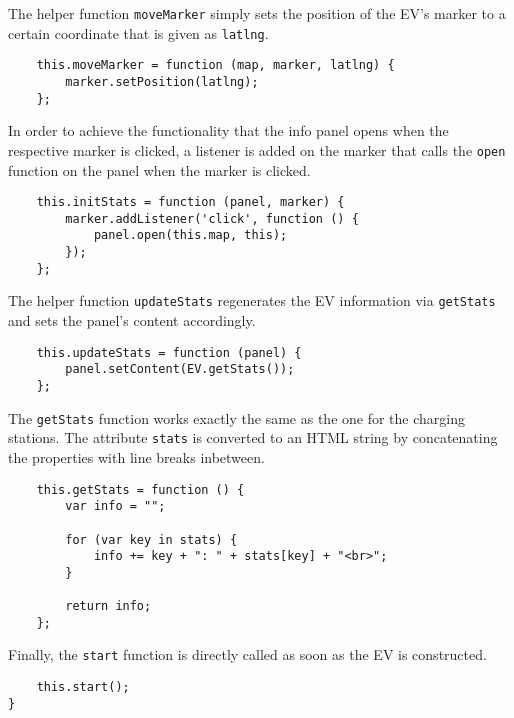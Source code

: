 The helper function \texttt{moveMarker} simply sets the position of the EV's marker to a certain coordinate that is given as \texttt{latlng}.

\begin{verbatim}
    this.moveMarker = function (map, marker, latlng) {
        marker.setPosition(latlng);
    };
\end{verbatim}

In order to achieve the functionality that the info panel opens when the respective marker is clicked, a listener is added on the marker that calls the \texttt{open} function on the panel when the marker is clicked.

\begin{verbatim}
    this.initStats = function (panel, marker) {
        marker.addListener('click', function () {
            panel.open(this.map, this);
        });
    };
\end{verbatim}

The helper function \texttt{updateStats} regenerates the EV information via \texttt{getStats} and sets the panel's content accordingly.

\begin{verbatim}
    this.updateStats = function (panel) {
        panel.setContent(EV.getStats());
    };
\end{verbatim}

The \texttt{getStats} function works exactly the same as the one for the charging stations. The attribute \texttt{stats} is converted to an HTML string by concatenating the properties with line breaks inbetween.

\begin{verbatim}
    this.getStats = function () {
        var info = "";

        for (var key in stats) {
            info += key + ": " + stats[key] + "<br>";
        }

        return info;
    };
\end{verbatim}

Finally, the \texttt{start} function is directly called as soon as the EV is constructed.

\begin{verbatim}
    this.start();
}
\end{verbatim}


